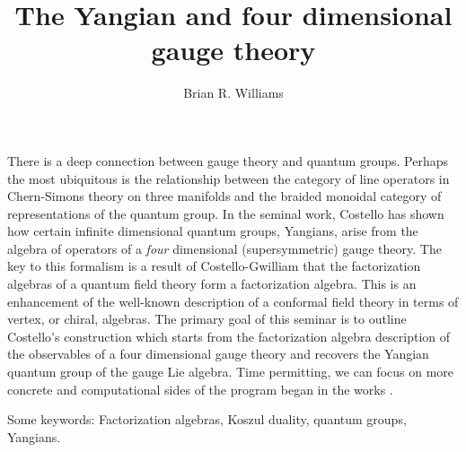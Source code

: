 \documentclass[10pt]{article}
\title{The Yangian and four dimensional gauge theory}
\author{Brian R. Williams}
\begin{document}
\maketitle

There is a deep connection between gauge theory and quantum groups.
Perhaps the most ubiquitous is the relationship between the category of line operators in Chern-Simons theory on three manifolds and the braided monoidal category of representations of the quantum group.
In the seminal work, Costello \cite{CosInt, CosYangian} has shown how certain infinite dimensional quantum groups, Yangians, arise from the algebra of operators of a {\em four} dimensional (supersymmetric) gauge theory.
The key to this formalism is a result of Costello-Gwilliam that the factorization algebras of a quantum field theory form a factorization algebra. 
This is an enhancement of the well-known description of a conformal field theory in terms of vertex, or chiral, algebras. 
The primary goal of this seminar is to outline Costello's construction which starts from the factorization algebra description of the observables of a four dimensional gauge theory and recovers the Yangian quantum group of the gauge Lie algebra. 
Time permitting, we can focus on more concrete and computational sides of the program began in the works \cite{CWY1, CWY2}.

Some keywords: Factorization algebras, Koszul duality, quantum groups, Yangians. 
\end{document}
